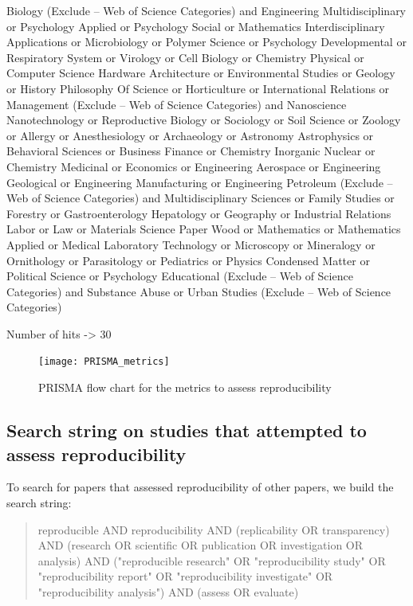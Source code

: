 \documentclass[
10pt, %
a4paper, %
oneside, %
headinclude,footinclude, %
BCOR5mm, %
]{scrartcl}
\begin{document}
Biology (Exclude – Web of Science Categories) and Engineering Multidisciplinary or Psychology Applied or Psychology Social or Mathematics Interdisciplinary Applications or Microbiology or Polymer Science or Psychology Developmental or Respiratory System or Virology or Cell Biology or Chemistry Physical or Computer Science Hardware Architecture or Environmental Studies or Geology or History Philosophy Of Science or Horticulture or International Relations or Management (Exclude – Web of Science Categories) and Nanoscience Nanotechnology or Reproductive Biology or Sociology or Soil Science or Zoology or Allergy or Anesthesiology or Archaeology or Astronomy Astrophysics or Behavioral Sciences or Business Finance or Chemistry Inorganic Nuclear or Chemistry Medicinal or Economics or Engineering Aerospace or Engineering Geological or Engineering Manufacturing or Engineering Petroleum (Exclude – Web of Science Categories) and Multidisciplinary Sciences or Family Studies or Forestry or Gastroenterology Hepatology or Geography or Industrial Relations Labor or Law or Materials Science Paper Wood or Mathematics or Mathematics Applied or Medical Laboratory Technology or Microscopy or Mineralogy or Ornithology or Parasitology or Pediatrics or Physics Condensed Matter or Political Science or Psychology Educational (Exclude – Web of Science Categories) and Substance Abuse or Urban Studies (Exclude – Web of Science Categories)

Number of hits -> 30

\begin{figure}[h]
    \centering
    \texttt{[image: PRISMA\_metrics]}
    \caption{PRISMA flow chart for the metrics to assess reproducibility}
    \label{fig:PRISMA_chart_metrics_assess_reproducibility}
\end{figure}


\subsection{Search string on studies that attempted to assess reproducibility}
To search for papers that assessed reproducibility of other papers, we build the search string:
\begin{quote}
reproducible AND reproducibility AND (replicability OR transparency) AND (research OR scientific OR publication OR investigation OR analysis) AND ("reproducible research" OR "reproducibility study" OR "reproducibility report" OR "reproducibility investigate" OR 
"reproducibility analysis") AND (assess OR evaluate)
\end{quote}
\end{document}
